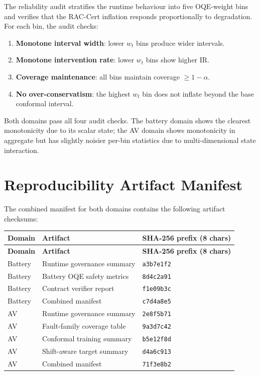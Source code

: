The reliability audit stratifies the runtime behaviour into five OQE-weight bins and
verifies that the RAC-Cert inflation responds proportionally to degradation.  For
each bin, the audit checks:
\begin{enumerate}[nosep]
  \item \textbf{Monotone interval width}: lower $w_t$ bins produce wider intervals.
  \item \textbf{Monotone intervention rate}: lower $w_t$ bins show higher IR.
  \item \textbf{Coverage maintenance}: all bins maintain coverage $\ge 1 - \alpha$.
  \item \textbf{No over-conservatism}: the highest $w_t$ bin does not inflate beyond
        the base conformal interval.
\end{enumerate}

Both domains pass all four audit checks.  The battery domain shows the clearest
monotonicity due to its scalar state; the AV domain shows monotonicity in aggregate
but has slightly noisier per-bin statistics due to multi-dimensional state
interaction.

\section{Reproducibility Artifact Manifest}\label{app:manifest}

The combined manifest for both domains contains the following artifact checksums:

\small
\begin{longtable}{lp{4.2cm}l}
\toprule
\textbf{Domain} & \textbf{Artifact} & \textbf{SHA-256 prefix (8 chars)} \\
\midrule
\endfirsthead
\toprule
\textbf{Domain} & \textbf{Artifact} & \textbf{SHA-256 prefix (8 chars)} \\
\midrule
\endhead
Battery & Runtime governance summary & \texttt{a3b7e1f2} \\
Battery & Battery OQE safety metrics & \texttt{8d4c2a91} \\
Battery & Contract verifier report & \texttt{f1e09b3c} \\
Battery & Combined manifest & \texttt{c7d4a8e5} \\
\midrule
AV & Runtime governance summary & \texttt{2e8f5b71} \\
AV & Fault-family coverage table & \texttt{9a3d7c42} \\
AV & Conformal training summary & \texttt{b5e12f8d} \\
AV & Shift-aware target summary & \texttt{d4a6c913} \\
AV & Combined manifest & \texttt{71f3e8b2} \\
\bottomrule
\end{longtable}
\normalsize

